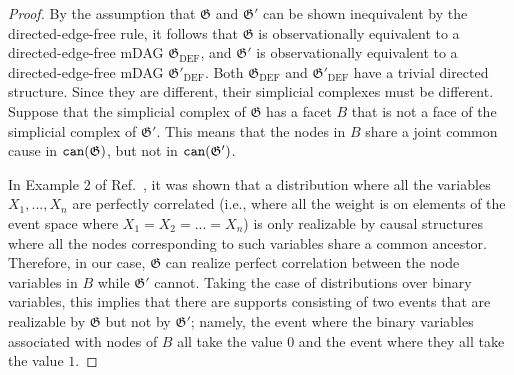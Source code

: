 \DEF*
\begin{proof}
	By the assumption that  $\mathfrak{G}$ and $\mathfrak{G}'$  can be shown inequivalent by the directed-edge-free rule, it follows that  $\mathfrak{G}$ is observationally equivalent to a directed-edge-free mDAG $\mathfrak{G}_\text{DEF}$, and  $\mathfrak{G}'$ is observationally equivalent to a directed-edge-free mDAG $\mathfrak{G}'_\text{DEF}$. Both $\mathfrak{G}_\text{DEF}$ and $\mathfrak{G}'_\text{DEF}$ have a trivial directed structure. Since they are different, their simplicial complexes must be different. Suppose that the simplicial complex of  $\mathfrak{G}$  has a facet $B$ that is not a face of  the simplicial complex of $\mathfrak{G}'$. This means that the nodes in $B$ share a joint common cause in $\mathtt{can}(\mathfrak{G})$, but not in $\mathtt{can}(\mathfrak{G}')$. 
	
	In Example 2 of Ref.~\cite{steudel_ay_2015}, it was shown that a distribution where all the variables $X_1,...,X_n$ are perfectly correlated (i.e., where all the weight is on elements of the event space where $X_1=X_2=...=X_n$) is only realizable by causal structures where all the nodes corresponding to such variables share a common ancestor. Therefore, in our case, $\mathfrak{G}$ can realize perfect correlation between the node variables in $B$ while $\mathfrak{G}'$ cannot. Taking the case of distributions over binary variables, this implies that there are supports consisting of two events that are realizable by $\mathfrak{G}$  but not by $\mathfrak{G}'$; namely, the event where the binary variables associated with nodes of $B$ all take the value $0$  and the event where they all take the value $1$.
\end{proof}